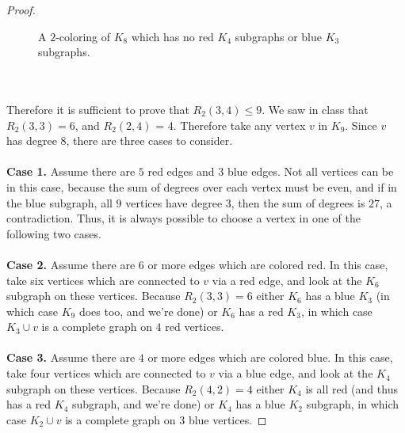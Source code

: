 \documentclass{article}
\begin{document}
\begin{proof}
\begin{figure}[h]
    \caption{A $2$-coloring of $K_8$ which has no red $K_4$ subgraphs or blue
    $K_3$ subgraphs.}
  \end{figure}
  \\~\\
  Therefore it is sufficient to prove that $R_2(3,4) \leq 9$. We saw in class
  that $R_2(3,3) = 6$, and $R_2(2,4)$ = 4.
  Therefore take any vertex $v$ in $K_9$. Since $v$ has degree $8$, there are
  three cases to consider.
  \\~\\
  \textbf{Case 1.} Assume there are $5$ red edges and $3$ blue edges.
  Not all vertices can be in this case, because the sum of degrees
  over each vertex must be even, and if in the blue subgraph, all $9$ vertices
  have degree $3$, then the sum of degrees is $27$, a contradiction. Thus,
  it is always possible to choose a vertex in one of the following two cases.
  \\~\\
  \textbf{Case 2.} Assume there are $6$ or more edges which are colored red.
  In this case, take six vertices which are connected to $v$ via a
  red edge, and look at the $K_6$ subgraph on these vertices. Because
  $R_2(3,3) = 6$ either $K_6$ has a blue $K_3$ (in which case $K_9$ does too,
  and we're done) or $K_6$ has a red $K_3$, in which case $K_3 \cup {v}$ is a
  complete graph on $4$ red vertices.
  \\~\\
  \textbf{Case 3.} Assume there are $4$ or more edges which are colored blue.
  In this case, take four vertices which are connected to $v$ via a
  blue edge, and look at the $K_4$ subgraph on these vertices. Because
  $R_2(4,2) = 4$ either $K_4$ is all red (and thus has a red $K_4$ subgraph,
  and we're done) or $K_4$ has a blue $K_2$ subgraph, in which case $K_2 \cup {v}$ is a
  complete graph on $3$ blue vertices.
\end{proof}
\pagebreak
\end{document}
